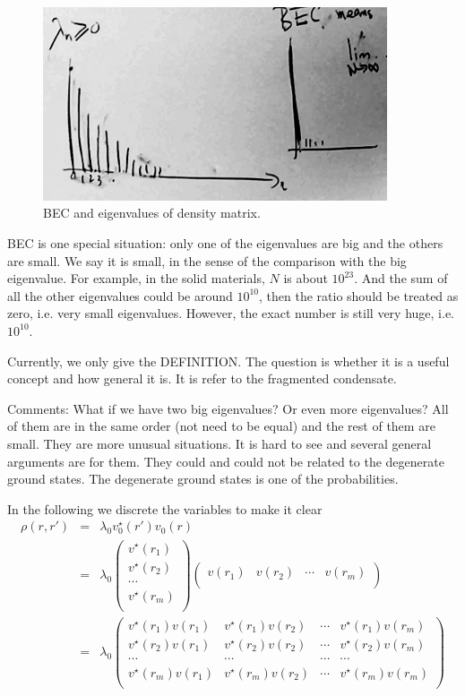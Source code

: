 \begin{figure}[htbp]
\centering
\includegraphics[width=4in]{image/ch1/1-4-bec.pdf} 
\caption{BEC and eigenvalues of density matrix.}
\label{fig:1-4}
\end{figure}

BEC is one special situation: only one of the eigenvalues are big and the others are small. We say it is small, in the sense of the comparison with the big eigenvalue. For example, in the solid materials, $N$ is about $10^{23}$. And the sum of all the other eigenvalues could be around $10^10$, then the ratio should be treated as zero, i.e. very small eigenvalues. However, the exact number is still very huge, i.e. $10^{10}$. 

Currently, we only give the DEFINITION. The question is whether it is a useful concept and how general it is. It is refer to the fragmented condensate. 

Comments: What if we have two big eigenvalues? Or even more eigenvalues? All of them are in the same order (not need to be equal) and the rest of them are small. They are more unusual situations. It is hard to see and several general arguments are for them. They could and could not be related to the degenerate ground states. The degenerate ground states is one of the probabilities.

In the following we discrete the variables to make it clear 
\begin{eqnarray}
\rho(r,r') &=& \lambda_0 v_0^\star(r')v_0(r) \\
&=& \lambda_0 \left(\begin{array}{c}
v^\star(r_1)\\
v^\star(r_2)\\
\cdots\\
v^\star(r_m)\\
\end{array}\right) 
\left(\begin{array}{cccc} v(r_1)& v(r_2)&\cdots & v(r_m)\\ \end{array}\right)\\
&=& \lambda_0 
\left(\begin{array}{cccc}
v^\star(r_1)v(r_1)& v^\star(r_1)v(r_2)&\cdots & v^\star(r_1)v(r_m)\\
v^\star(r_2)v(r_1)& v^\star(r_2)v(r_2)&\cdots & v^\star(r_2)v(r_m)\\
\cdots& \cdots&\cdots & \cdots\\
v^\star(r_m)v(r_1)& v^\star(r_m)v(r_2)&\cdots & v^\star(r_m)v(r_m)\\
\end{array}\right)
\end{eqnarray}

